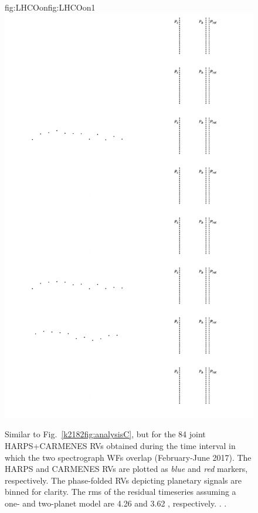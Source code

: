 \begin{figure}
\begin{ocg}{fig:LHCOon}{fig:LHCOon}{1}
  \includegraphics[width=0.8\hsize]{figures/analysisHCoverlap_lines.png}%
  \end{ocg}
  \hspace{-0.8\hsize}%
  \caption[RV timeseries and models from analysis of the joint K2-18 RVs from HARPS and CARMENES during their overlap between February and June 2017.]
    {\small Similar to Fig.~\ref{k2182fig:analysisC}, but for the 84 joint HARPS+CARMENES RVs
    obtained during the time interval in which the two spectrograph WFs overlap (February-June 2017).
    The HARPS and CARMENES RVs are plotted as \emph{blue} and \emph{red} markers, respectively.
    The phase-folded RVs depicting planetary signals are binned for clarity.
    The rms of the residual timeseries assuming a one- and two-planet model are
    4.26 and 3.62 \mps{}, respectively.
    .
    .}
  \label{k2182fig:analysisHCoverlap}
\end{figure}


